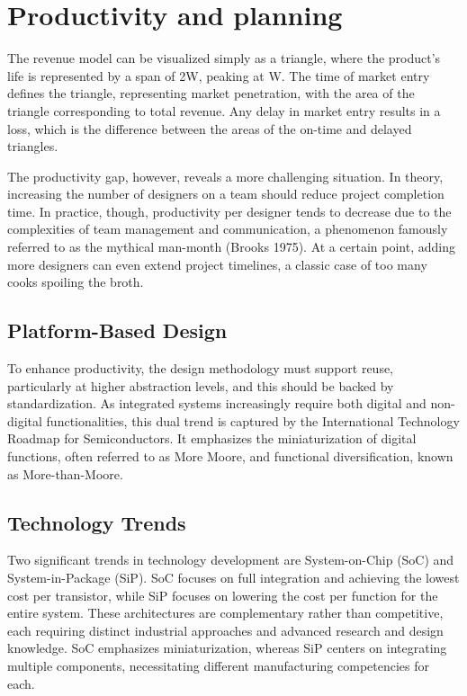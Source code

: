 \section{Productivity and planning}

The revenue model can be visualized simply as a triangle, where the product's life is represented by a span of 2W, peaking at W. 
The time of market entry defines the triangle, representing market penetration, with the area of the triangle corresponding to total revenue.
Any delay in market entry results in a loss, which is the difference between the areas of the on-time and delayed triangles.

The productivity gap, however, reveals a more challenging situation. 
In theory, increasing the number of designers on a team should reduce project completion time. 
In practice, though, productivity per designer tends to decrease due to the complexities of team management and communication, a phenomenon famously referred to as the mythical man-month (Brooks 1975). 
At a certain point, adding more designers can even extend project timelines, a classic case of too many cooks spoiling the broth.

\subsection{Platform-Based Design}
To enhance productivity, the design methodology must support reuse, particularly at higher abstraction levels, and this should be backed by standardization. 
As integrated systems increasingly require both digital and non-digital functionalities, this dual trend is captured by the International Technology Roadmap for Semiconductors. 
It emphasizes the miniaturization of digital functions, often referred to as More Moore, and functional diversification, known as More-than-Moore.

\subsection{Technology Trends}
Two significant trends in technology development are System-on-Chip (SoC) and System-in-Package (SiP). 
SoC focuses on full integration and achieving the lowest cost per transistor, while SiP focuses on lowering the cost per function for the entire system. 
These architectures are complementary rather than competitive, each requiring distinct industrial approaches and advanced research and design knowledge. 
SoC emphasizes miniaturization, whereas SiP centers on integrating multiple components, necessitating different manufacturing competencies for each.

